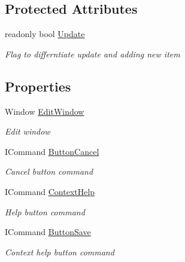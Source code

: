 \subsection*{Protected Attributes}
\begin{DoxyCompactItemize}
\item 
readonly bool \hyperlink{class_baudi_1_1_client_1_1_view_models_1_1_edit_window_view_models_1_1_edit_window_view_model_a67938bab2f6555d910bf4aef19c25f1a}{Update}
\begin{DoxyCompactList}\small\item\em Flag to differntiate update and adding new item \end{DoxyCompactList}\end{DoxyCompactItemize}
\subsection*{Properties}
\begin{DoxyCompactItemize}
\item 
Window \hyperlink{class_baudi_1_1_client_1_1_view_models_1_1_edit_window_view_models_1_1_edit_window_view_model_ab0afc25d7d47a9b3b7c156e50ece8b42}{Edit\+Window}
\begin{DoxyCompactList}\small\item\em Edit window \end{DoxyCompactList}\item 
I\+Command \hyperlink{class_baudi_1_1_client_1_1_view_models_1_1_edit_window_view_models_1_1_edit_window_view_model_a351eca9627f00a962e4612620eb97fef}{Button\+Cancel}
\begin{DoxyCompactList}\small\item\em Cancel button command \end{DoxyCompactList}\item 
I\+Command \hyperlink{class_baudi_1_1_client_1_1_view_models_1_1_edit_window_view_models_1_1_edit_window_view_model_a592494ae17ce7701009cf28d566af9b5}{Context\+Help}
\begin{DoxyCompactList}\small\item\em Help button command \end{DoxyCompactList}\item 
I\+Command \hyperlink{class_baudi_1_1_client_1_1_view_models_1_1_edit_window_view_models_1_1_edit_window_view_model_ad5731439fd1c3de71ce354f9f019088d}{Button\+Save}
\begin{DoxyCompactList}\small\item\em Context help button command \end{DoxyCompactList}\end{DoxyCompactItemize}
